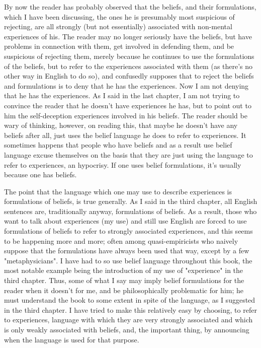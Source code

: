 \documentclass[10pt,twoside]{memoir}
\begin{document}
\begin{enumerate}
{By now the reader has probably observed that the beliefs, and their 
formulations, which I have been discussing, the ones he is presumably most 
suspicious of rejecting, are all strongly (but not essentially) associated with 
non-mental experiences of his. The reader may no longer seriously have the 
beliefs, but have problems in connection with them, get involved in 
defending them, and be suspicious of rejecting them, merely because he 
continues to use the formulations of the beliefs, but to refer to the 
experiences associated with them (as there's no other way in English to do 
so), and confusedly supposes that to reject the beliefs and formulations is to 
deny that he has the experiences. Now I am not denying that he has the 
experiences. As I said in the last chapter, I am not trying to convince the 
reader that he doesn't have experiences he has, but to point out to him the 
self-deception experiences involved in his beliefs. The reader should be wary 
of thinking, however, on reading this, that maybe he doesn't have any beliefs 
after all, just uses the belief language he does to refer to experiences. It 
sometimes happens that people who have beliefs and as a result use belief 
language excuse themselves on the basis that they are just using the language 
to refer to experiences, an hypocrisy. If one uses belief formulations, it's 
usually because one has beliefs. 

The point that the language which one may use to describe experiences 
is formulations of beliefs, is true generally. As I said in the third chapter, all 
English sentences are, traditionally anyway, formulations of beliefs. As a 
result, those who want to talk about experiences (my use) and still use 
English are forced to use formulations of beliefs to refer to strongly 
associated experiences, and this seems to be happening more and more; often 
among quasi-empiricists who naively suppose that the formulations have 
always been used that way, except by a few "metaphysicians". I have had to 
so use belief language throughout this book, the most notable example being 
the introduction of my use of "experience" in the third chapter. Thus, some 
of what I say may imply belief formulations for the reader when it doesn't 
for me, and be philosophically problematic for him; he must understand the 
book to some extent in spite of the language, as I suggested in the third 
chapter. I have tried to make this relatively easy by choosing, to refer to 
experiences, language with which they are very strongly associated and 
which is only weakly associated with beliefs, and, the important thing, by 
announcing when the language is used for that purpose. 

}
\end{enumerate}
\end{document}
